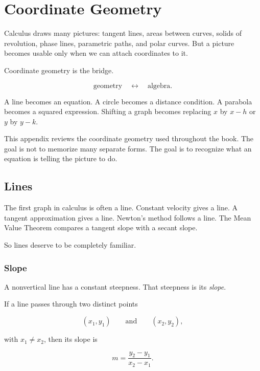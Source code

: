 
\chapter{Coordinate Geometry}
\label{app:coordinate-geometry}

Calculus draws many pictures: tangent lines, areas between curves, solids of
revolution, phase lines, parametric paths, and polar curves.  But a picture becomes
usable only when we can attach coordinates to it.

Coordinate geometry is the bridge.

\[
\text{geometry}
\quad\longleftrightarrow\quad
\text{algebra}.
\]

A line becomes an equation.  A circle becomes a distance condition.  A parabola
becomes a squared expression.  Shifting a graph becomes replacing \(x\) by
\(x-h\) or \(y\) by \(y-k\).

This appendix reviews the coordinate geometry used throughout the book.  The
goal is not to memorize many separate forms.  The goal is to recognize what an
equation is telling the picture to do.

\section{Lines}
\label{appsec:lines}

The first graph in calculus is often a line.  Constant velocity gives a line.  A
tangent approximation gives a line.  Newton's method follows a line.  The Mean
Value Theorem compares a tangent slope with a secant slope.

So lines deserve to be completely familiar.

\subsection{Slope}
\label{appsubsec:slope}

A nonvertical line has a constant steepness.  That steepness is its \emph{slope}.

If a line passes through two distinct points

\[
(x_1,y_1)
\qquad\text{and}\qquad
(x_2,y_2),
\]

with \(x_1\neq x_2\), then its slope is

\[
\boxed{
m=\frac{y_2-y_1}{x_2-x_1}.
}
\]

